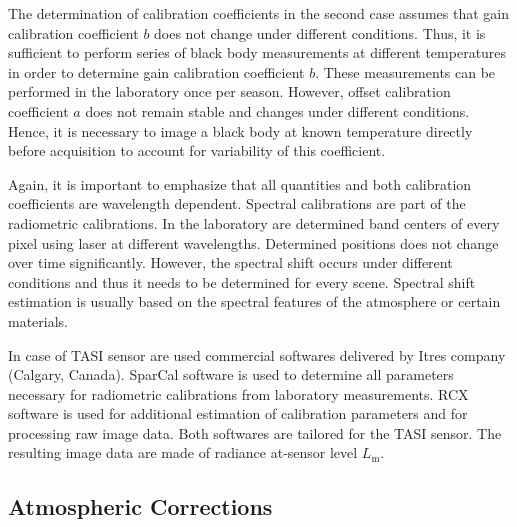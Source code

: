 The determination of calibration coefficients in the second case assumes that gain calibration coefficient $b$ does not change under different conditions. Thus, it is sufficient to perform series of black body measurements at different temperatures in order to determine gain calibration coefficient $b$. These measurements can be performed in the laboratory once per season. However, offset calibration coefficient $a$ does not remain stable and changes under different conditions. Hence, it is necessary to image a black body at known temperature directly before acquisition to account for variability of this coefficient.


Again, it is important to emphasize that all quantities and both calibration coefficients are wavelength dependent. Spectral calibrations are part of the radiometric calibrations. In the laboratory are determined band centers of every pixel using laser at different wavelengths. Determined positions does not change over time significantly. However, the spectral shift occurs under different conditions and thus it needs to be determined for every scene. Spectral shift estimation is usually based on the spectral features of the atmosphere or certain materials.

In case of TASI sensor are used commercial softwares delivered by Itres company (Calgary, Canada). SparCal software \cite{software:SparCal} is used to determine all parameters necessary for radiometric calibrations from laboratory measurements. RCX software \cite{software:RCX} is used for additional  estimation of calibration parameters and for processing raw image data. Both softwares are tailored for the TASI sensor. The resulting image data are made of radiance at-sensor level $L_\mathrm{m}$.

\subsection{Atmospheric Corrections}

